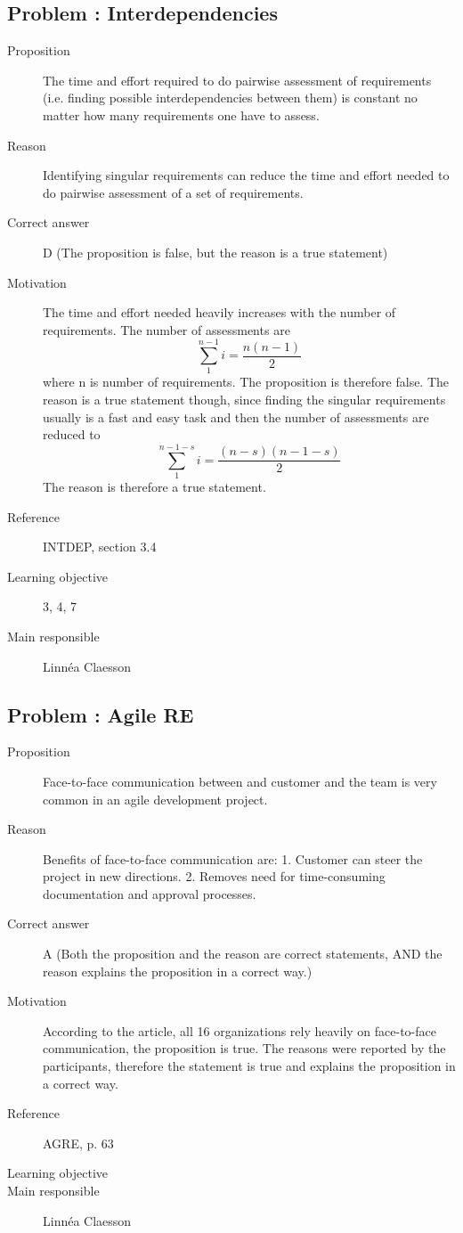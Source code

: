 \documentclass[10pt,a4paper]{article}
\begin{document}
\subsection*{Problem : Interdependencies}
\begin{description}
\item[Proposition] The time and effort required to do pairwise assessment of requirements (i.e. finding possible interdependencies between them) is constant no matter how many requirements one have to assess. 
\item[Reason] Identifying singular requirements can reduce the time and effort needed to do pairwise assessment of a set of requirements. 
\item[Correct answer] D (The proposition is false, but the reason is a true statement)
\item[Motivation] The time and effort needed heavily increases with the number of requirements. The number of assessments are 
\begin{equation}
\sum_{1}^{n-1}i = \frac{n(n-1)}{2} 
\end{equation}
where n is number of requirements. The proposition is therefore false. The reason is a true statement though, since finding the singular requirements usually is a fast and easy task and then the number of assessments are reduced to
\begin{equation}
\sum_{1}^{n-1-s}i = \frac{(n-s)(n-1-s)}{2} 
\end{equation}
The reason is therefore a true statement.
\item[Reference] INTDEP, section 3.4
\item[Learning objective] 3, 4, 7
\item[Main responsible] Linn\'ea Claesson
\end{description}

\subsection*{Problem : Agile RE}
\begin{description}
\item[Proposition] Face-to-face communication between and customer and the team is very common in an agile development project.
\item[Reason] Benefits of face-to-face communication are: 1. Customer can steer the project in new directions. 2. Removes need for time-consuming documentation and approval processes.
\item[Correct answer] A (Both the proposition and the reason are correct statements, AND the reason explains the proposition in a correct way.)
\item[Motivation] According to the article, all 16 organizations rely heavily on face-to-face communication, the proposition is true. The reasons were reported by the participants, therefore the statement is true and explains the proposition in a correct way.
\item[Reference] AGRE, p. 63 
\item[Learning objective]
\item[Main responsible] Linn\'ea Claesson
\end{description}
\end{document}
